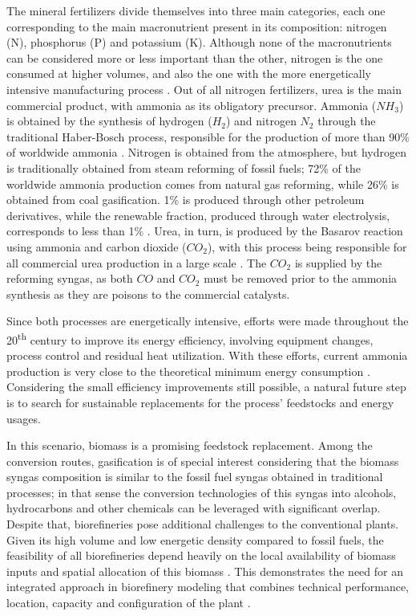 \documentclass[a4paper, titlepage]{article}
\begin{document}
The mineral fertilizers divide themselves into three main categories, each one corresponding to the main
macronutrient present in its composition: nitrogen (N), phosphorus (P) and potassium (K). Although none of the
macronutrients can be considered more or less important than the other, nitrogen is the one consumed at higher
volumes, and also the one with the more energetically intensive manufacturing
process \cite{ieaAmmoniaTechnologyRoadmap2021}. Out of all nitrogen fertilizers, urea is the main commercial product,
with ammonia as its obligatory precursor. Ammonia ($NH_3$) is obtained by the synthesis of hydrogen ($H_2$)
and nitrogen $N_2$ through the traditional Haber-Bosch process, responsible for the production of more than 90\% of
worldwide ammonia \cite{applAmmoniaPrinciplesIndustrial1999}. Nitrogen is obtained from the atmosphere,
but hydrogen is traditionally obtained from steam reforming of fossil fuels; 72\% of the worldwide ammonia
production comes from natural gas reforming, while 26\% is obtained from coal gasification. 1\% is produced
through other petroleum derivatives, while the renewable fraction, produced through water electrolysis,
corresponds to less than 1\% \cite{ieaAmmoniaTechnologyRoadmap2021}. Urea, in turn, is produced by the Basarov reaction
using ammonia and carbon dioxide ($CO_2$), with this process being responsible for all commercial urea production
in a large scale \cite{meessenUrea2010}. The $CO_2$ is supplied by the reforming syngas, as both $CO$ and $CO_2$ must
be removed prior to the ammonia synthesis as they are poisons to the commercial catalysts.

Since both processes are energetically intensive, efforts were made throughout the 20\textsuperscript{th} century to
improve its energy efficiency, involving equipment changes, process control and residual heat utilization. With these
efforts, current ammonia production is very close to the theoretical minimum energy consumption
\cite{ieaAmmoniaTechnologyRoadmap2021}.
Considering the small efficiency improvements still possible, a natural future step is to search for sustainable
replacements for the process’ feedstocks and energy usages.

In this scenario, biomass is a promising feedstock replacement. Among the conversion routes, gasification is of special
interest considering that the biomass syngas composition is similar to the fossil fuel syngas obtained in traditional
processes; in that sense the conversion technologies of this syngas into alcohols, hydrocarbons and other chemicals
can be leveraged with significant overlap. Despite that, biorefineries pose additional challenges to the conventional
plants. Given its high volume and low energetic density compared to fossil fuels, the feasibility of all biorefineries
depend heavily on the local availability of biomass inputs and spatial allocation of this biomass
. This demonstrates the need for an integrated approach in biorefinery
modeling that combines technical performance, location, capacity and configuration of the plant
\cite{schroderImprovingBiorefineryPlanning2018}.
\end{document}
